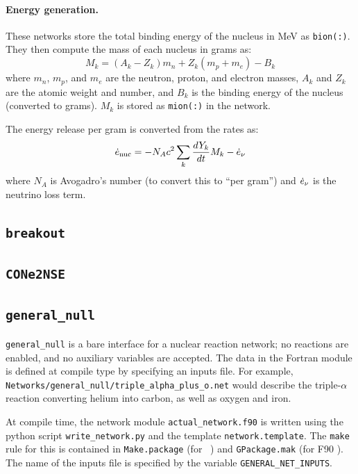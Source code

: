 \paragraph{Energy generation.} These networks store the total binding
energy of the nucleus in MeV as {\tt bion(:)}.  They then compute the
mass of each nucleus in grams as:
\begin{equation}
M_k = (A_k - Z_k) m_n + Z_k (m_p + m_e) - B_k
\end{equation}
where $m_n$, $m_p$, and $m_e$ are the neutron, proton, and electron
masses, $A_k$ and $Z_k$ are the atomic weight and number, and $B_k$
is the binding energy of the nucleus (converted to grams).  $M_k$
is stored as {\tt mion(:)} in the network.

The energy release per gram is converted from the rates as:
\begin{equation}
{{\dot{e}_\mathrm{nuc}}} = -N_A c^2 \sum_k \frac{dY_k}{dt} M_k - {{\dot{e}_\nu}}
\end{equation}
where $N_A$ is Avogadro's number (to convert this to ``per gram'')
and ${{\dot{e}_\nu}}$ is the neutrino loss term.

\subsection{{\tt breakout}}

\subsection{{\tt CONe2NSE}}

\subsection{{\tt general\_null}}

{\tt general\_null} is a bare interface for a nuclear reaction
network; no reactions are enabled, and no auxiliary variables are
accepted.  The data in the Fortran module is defined at compile type
by specifying an inputs file.  For example, {\tt
  Networks/general\_null/triple\_alpha\_plus\_o.net} would describe
the triple-$\alpha$ reaction converting helium into carbon, as well as
oxygen and iron.

At compile time, the network module {\tt actual\_network.f90}
is written using the python script {\tt write\_network.py}
and the template {\tt network.template}.  The {\tt make} rule
for this is contained in {\tt Make.package} (for \cpp\ \amrex) and
{\tt GPackage.mak} (for F90 \amrex).  The name of the inputs file
is specified by the variable {\tt GENERAL\_NET\_INPUTS}.

